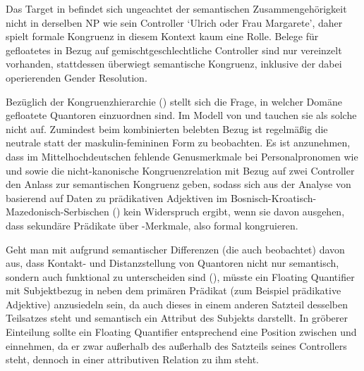 \begin{exe}
\end{exe}

Das Target  in  befindet sich
ungeachtet der semantischen Zusammengehörigkeit nicht in derselben NP wie sein
Controller  `Ulrich oder Frau Margarete', daher
spielt formale Kongruenz in diesem Kontext kaum eine Rolle. Belege für
gefloatetes  in Bezug auf gemischtgeschlechtliche Controller sind
nur vereinzelt vorhanden, stattdessen überwiegt semantische Kongruenz,
inklusive der dabei operierenden Gender Resolution.

Bezüglich der Kongruenzhierarchie
() stellt sich die Frage, in welcher Domäne gefloatete
Quantoren einzuordnen sind. Im Modell von \citet{corbett1979} und
\citet[84]{wechslerzlatic2003} tauchen sie als solche nicht auf. Zumindest beim
kombinierten belebten Bezug ist regelmäßig die neutrale statt der
maskulin-\allowbreak{}femi\-ninen Form zu beobachten. Es ist anzunehmen, dass
im Mittelhochdeutschen fehlende Genusmerkmale bei
Personalpronomen wie  und  sowie die nicht-kanonische
Kongruenzrelation mit Bezug auf zwei Controller den Anlass zur semantischen
Kongruenz geben, sodass sich aus der Analyse von \citet[54--55,
84]{wechslerzlatic2003} basierend auf Daten zu prädikativen
Adjektiven im
Bosnisch-\allowbreak{}Kroatisch-\allowbreak{}Mazedonisch-\allowbreak{}Serbischen
() kein Widerspruch ergibt, wenn sie davon ausgehen, dass sekundäre
Prädikate über -Merkmale, also formal kongruieren.

Geht man mit \citet{spector2009} aufgrund semantischer Differenzen (die auch
\cite{pittner1995} beobachtet) davon aus, dass Kontakt- und Distanzstellung von
Quantoren nicht nur semantisch, sondern auch funktional zu unterscheiden sind
(), müsste ein Floating Quantifier mit Subjektbezug in
 neben dem primären Prädikat (zum Beispiel prädikative
Adjektive) anzusiedeln sein, da auch dieses in einem
anderen Satzteil desselben Teilsatzes steht und semantisch ein
Attribut des Subjekts darstellt. In 
gröberer Einteilung sollte ein Floating Quantifier entsprechend eine Position
zwischen  und  einnehmen, da er zwar
außerhalb des außerhalb des Satzteils seines Controllers steht, dennoch in
einer attributiven Relation zu ihm steht.

